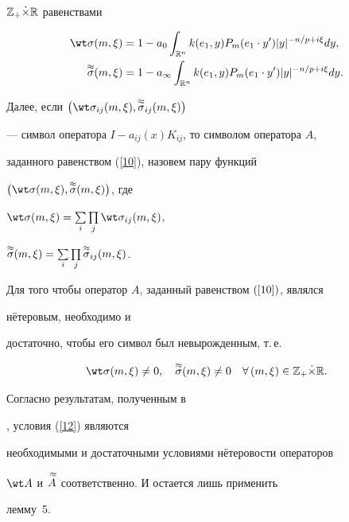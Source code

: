 $\Bbb Z_+\Dot\times\Bbb R$ равенствами


\begin{align*}


\wt\sigma(m,\xi)&=1-a_0\int_{\Bbb R^n}


k(e_1,y)P_m(e_1\cdot y')|y|^{-n/p+i\xi}dy,\\


%


\apsigma(m,\xi)&=1-a_\infty\int_{\Bbb R^n}


k(e_1,y)P_m(e_1\cdot y')|y|^{-n/p+i\xi}dy.


\end{align*}


Далее, если $\big(\wt\sigma_{ij}(m,\xi),\apsigma_{ij}(m,\xi)\big)$


--- символ оператора $I-a_{ij}(x)K_{ij}$, то символом оператора $A$,


заданного равенством (\ref{10}), назовем пару функций


$\big(\wt\sigma(m,\xi),\apsigma(m,\xi)\big)$, где


$\wt\sigma(m,\xi)=\sum\limits_i\prod\limits_j \wt\sigma_{ij}(m,\xi)$,


$\overset{\approx}{\sigma}{}(m,\xi)=\sum\limits_i\prod\limits_j \overset{\approx}{\sigma}{}_{ij}(m,\xi)$.





\begin{lem}


Для того чтобы оператор $A$, заданный равенством $(\ref{10})$, являлся


н\"етеровым, необходимо и


достаточно, чтобы его символ был невырожденным, т.\,е.


\begin{equation}


\wt\sigma(m,\xi)\ne 0,\quad \apsigma(m,\xi)\ne 0\quad


\forall\, (m,\xi)\in \Bbb Z_+\Dot\times\Bbb R.


\label{12}


\end{equation}


\end{lem}





\begin{pf}


Согласно результатам, полученным в


\cite{b3}, условия (\ref{12}) являются


необходимыми и достаточными условиями н\"етеровости операторов


$\wt A$ и $\overset{\;\approx}{A}{}$ соответственно. И остается лишь применить


лемму~5.


\end{pf}





